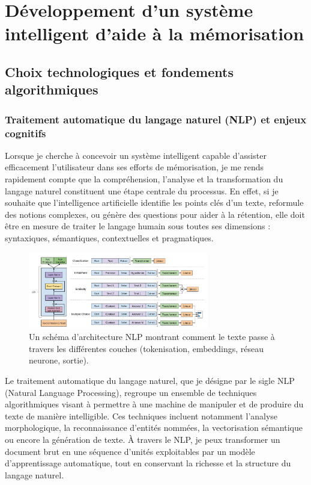 \documentclass[11pt,a4paper]{report}
\begin{document}
\chapter{Développement d’un système intelligent d’aide à la mémorisation}

\section{Choix technologiques et fondements algorithmiques}

\subsection{Traitement automatique du langage naturel (NLP) et enjeux cognitifs}

Lorsque je cherche à concevoir un système intelligent capable d’assister efficacement l’utilisateur dans ses efforts de mémorisation, je me rends rapidement compte que la compréhension, l’analyse et la transformation du langage naturel constituent une étape centrale du processus. En effet, si je souhaite que l’intelligence artificielle identifie les points clés d’un texte, reformule des notions complexes, ou génère des questions pour aider à la rétention, elle doit être en mesure de traiter le langage humain sous toutes ses dimensions : syntaxiques, sémantiques, contextuelles et pragmatiques.

\begin{figure}[h]
    \centering
    \includegraphics[width=0.7\textwidth]{images/3.1.1.png}
    \caption{Un schéma d’architecture NLP montrant comment le texte passe à travers les différentes couches (tokenisation, embeddings, réseau neurone, sortie).}
    \label{fig:3.1.1}
\end{figure}

Le traitement automatique du langage naturel, que je désigne par le sigle NLP (Natural Language Processing), regroupe un ensemble de techniques algorithmiques visant à permettre à une machine de manipuler et de produire du texte de manière intelligible. Ces techniques incluent notamment l’analyse morphologique, la reconnaissance d’entités nommées, la vectorisation sémantique ou encore la génération de texte. À travers le NLP, je peux transformer un document brut en une séquence d’unités exploitables par un modèle d’apprentissage automatique, tout en conservant la richesse et la structure du langage naturel.
\end{document}
